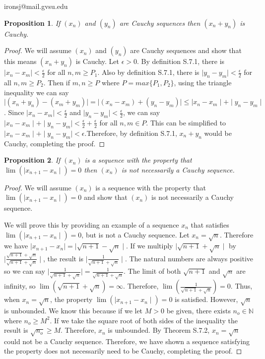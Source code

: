 \documentclass[11 pt]{article}
\newtheorem{proposition}{Proposition}
\newcommand{\newpar}{\vspace{.15in}\noindent}
\begin{document}
\noindent ironsj@mail.gvsu.edu
\newpar
\begin{proposition}
If $(x_n)$ and $(y_n)$ are Cauchy sequences then $(x_n+y_n)$ is Cauchy.

\end{proposition}
\begin{proof}
We will assume $(x_n)$ and $(y_n)$ are Cauchy sequences and show that this means $(x_n+y_n)$ is Cauchy. Let $\epsilon>0$. By definition S.7.1, there is $\mid x_n-x_m\mid<\frac{\epsilon}{2}$ for all $n,m\ge P_1$. Also by definition S.7.1, there is $\mid y_n-y_m\mid<\frac{\epsilon}{2}$ for all $n,m\ge P_2$. Then if $m,n\ge P$ where $P=max\{P_1,P_2\}$, using the triangle inequality we can say $\mid(x_n+y_n)-(x_m+y_m)\mid=\mid(x_n-x_m)+(y_n-y_m)\mid\le\mid x_n-x_m\mid+\mid y_n-y_m\mid$. Since $\mid x_n-x_m\mid<\frac{\epsilon}{2}$ and $\mid y_n-y_m\mid<\frac{\epsilon}{2}$, we can say $\mid x_n-x_m\mid+\mid y_n-y_m\mid<\frac{\epsilon}{2}+\frac{\epsilon}{2}$ for all $n,m\in P$. This can be simplified to $\mid x_n-x_m\mid+\mid y_n-y_m\mid<\epsilon$.Therefore, by definition S.7.1, $x_n+y_n$ would be Cauchy, completing the proof.



\end{proof}

\newpar
\begin{proposition}
If $(x_n)$ is a sequence with the property that $\lim(\mid x_{n+1}-x_n\mid)=0$ then $(x_n)$ is not necessarily a Cauchy
sequence.

\end{proposition}
\begin{proof}
\newpar 
We will assume $(x_n)$ is a sequence with the property that $\lim(\mid x_{n+1}-x_n\mid)=0$ and show that $(x_n)$ is not necessarily a Cauchy sequence.

\newpar
We will prove this by providing an example of a sequence $x_n$ that satisfies $\lim(\mid x_{n+1}-x_n\mid)=0$, but is not a Cauchy sequence. Let $x_n=\sqrt{n}$. Therefore we have $\mid x_{n+1}-x_n\mid=\mid\sqrt{n+1}-\sqrt{n}\mid$. If we multiply $\mid\sqrt{n+1}+\sqrt{n}\mid$ by $\mid\frac{\sqrt{n+1}+\sqrt{n}}{\sqrt{n+1}+\sqrt{n}}\mid$, the result is $\mid\frac{1}{\sqrt{n+1}+\sqrt{n}}\mid$. The natural numbers are always positive so we can say $\mid\frac{1}{\sqrt{n+1}+\sqrt{n}}\mid=\frac{1}{\sqrt{n+1}+\sqrt{n}}$. The limit of both $\sqrt{n+1}$ and $\sqrt{n}$ are infinity, so $\lim(\sqrt{n+1}+\sqrt{n})=\infty$. Therefore, $\lim(\frac{1}{\sqrt{n+1}+\sqrt{n}})=0$. Thus, when $x_n=\sqrt{n}$, the property $\lim(\mid x_{n+1}-x_n\mid)=0$ is satisfied. However, $\sqrt{n}$ is unbounded. We know this because if we let $M>0$ be given, there exists $n_o\in\mathbb{N}$ where $n_o\ge M^2$. If we take the square root of both sides of the inequality the result is $\sqrt{n_o}\ge M$. Therefore, $x_n$ is unbounded. By Theorem S.7.2, $x_n=\sqrt{n}$ could not be a Cauchy sequence. Therefore, we have shown a sequence satisfying the property does not necessarily need to be Cauchy, completing the proof.
\end{proof}
\end{document}
